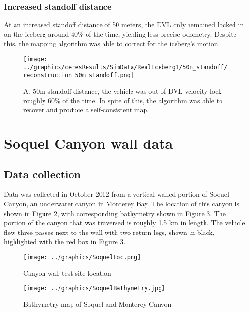 \subsubsection{Increased standoff distance}

At an increased standoff distance of 50 meters, the DVL only remained locked in on the iceberg around 40\% of the time, yielding less precise odometry. Despite this, the mapping algorithm was able to correct for the iceberg's motion.

 \begin{figure}[!htb]
   \centering
   \texttt{[image: ../graphics/ceresResults/SimData/RealIceberg1/50m\_standoff/reconstruction\_50m\_standoff.png]} %
   \caption{At 50m standoff distance, the vehicle was out of DVL velocity lock roughly 60\% of the time. In spite of this, the algorithm was able to recover and produce a self-consistent map.}
   \label{fig:FullSim50m}
\end{figure}


\clearpage
\section{Soquel Canyon wall data}

\subsection{Data collection}

Data was collected in October 2012 from a vertical-walled portion of Soquel Canyon, an underwater canyon in Monterey Bay. The location of this canyon is shown in Figure \ref{fig:SoquelLoc}, with corresponding bathymetry shown in Figure \ref{fig:SoquelBathy}. The portion of the canyon that was traversed is roughly 1.5 km in length. The vehicle flew three passes next to the wall with two return legs, shown in black, highlighted with the red box in Figure \ref{fig:SoquelBathy}.

 \begin{figure}[!htb]
   \centering
   \texttt{[image: ../graphics/SoquelLoc.png]} %
   \caption{Canyon wall test site location}
   \label{fig:SoquelLoc}
\end{figure}

 \begin{figure}[!htb]
   \centering
   \texttt{[image: ../graphics/SoquelBathymetry.jpg]} %
   \caption{Bathymetry map of Soquel and Monterey Canyon}
   \label{fig:SoquelBathy}
\end{figure}

